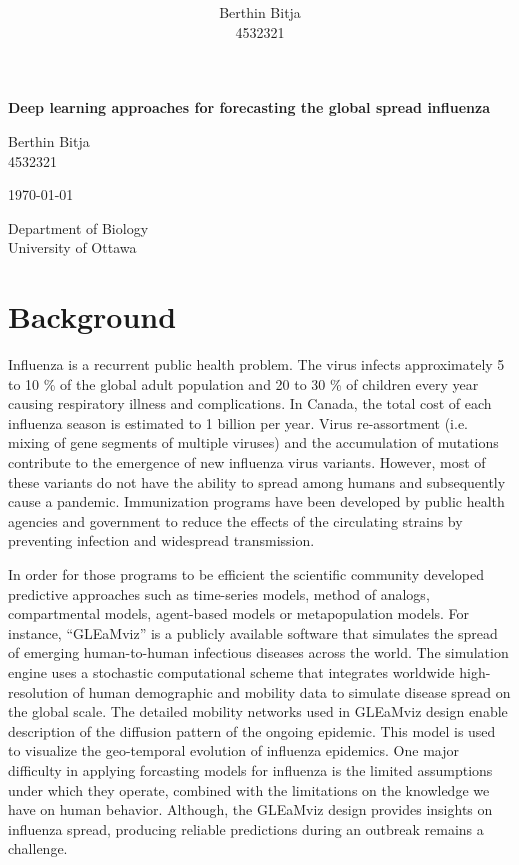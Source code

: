 \documentclass[12pt]{article}
\title{ }
\author{Berthin Bitja \\ 4532321}
\date{}
\begin{document}
\begin{titlepage}
	\centering

	{\Large\bfseries Deep learning approaches for forecasting the global spread influenza \par}
	\vspace{2cm}
	{\small Berthin Bitja \\ 4532321 \par}
	{\small \today\par}
	\vfill
	
	{\large Department of Biology \\ University of Ottawa \par}


\end{titlepage}

\newpage

\tableofcontents

\newpage

\section{Background}
Influenza is a recurrent public health problem. The virus infects approximately 5 to 10 \% of the global adult population and 20 to 30 \% of children every year causing respiratory illness and complications\autocite{Ting2017}. In Canada, the total cost of each influenza season is estimated to 1 billion per year\autocite{Molinari2007}. Virus re-assortment (i.e. mixing of gene segments of multiple viruses) and the accumulation of mutations contribute to the emergence of new influenza virus variants. However, most of these variants do not have the ability to spread among humans and subsequently cause a pandemic. Immunization programs have been developed by public health agencies and government to reduce the effects of the circulating strains by preventing infection and widespread transmission\autocite{Jefferson2005}. 

In order for those programs to be efficient the scientific community developed predictive approaches such as time-series models, method of analogs, compartmental models, agent-based models or metapopulation models\autocite{nsoesie2014}. For instance, “GLEaMviz” is a publicly available software that simulates the spread of emerging human-to-human infectious diseases across the world. The simulation engine uses a stochastic computational scheme that integrates worldwide high-resolution of human demographic and mobility data to simulate disease spread on the global scale. The detailed mobility networks used in GLEaMviz design enable description of the diffusion pattern of the ongoing epidemic\autocite{Broeck2011}. This model is used to visualize the geo-temporal evolution of influenza epidemics. One major difficulty in applying forcasting models for influenza is the limited assumptions under which they operate, combined with the limitations on the knowledge we have on human behavior. Although, the GLEaMviz design provides insights on influenza spread, producing reliable predictions during an outbreak remains a challenge.
\end{document}
